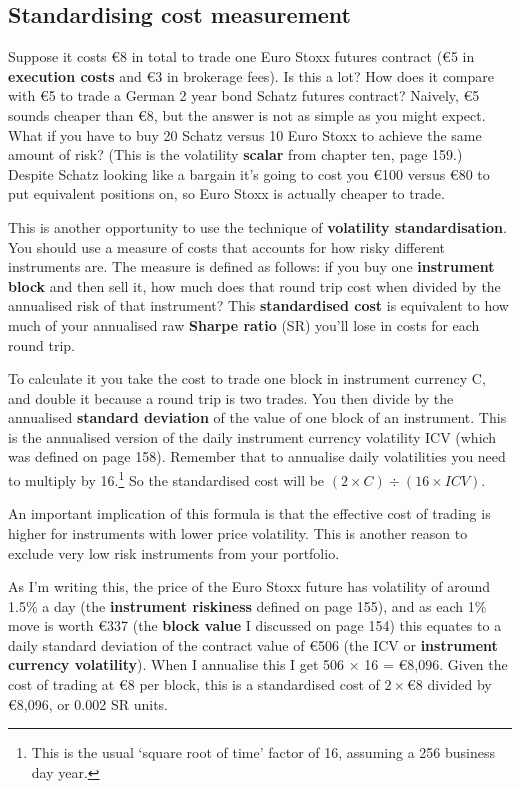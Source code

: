 \subsection*{Standardising cost measurement}

Suppose it costs €8 in total to trade one Euro Stoxx futures contract (€5 in \textbf{execution costs} and €3 in brokerage fees). Is this a lot? How does it compare with €5 to trade a German 2 year bond Schatz futures contract? Naively, €5 sounds cheaper than €8, but the answer is not as simple as you might expect. What if you have to buy 20 Schatz versus 10 Euro Stoxx to achieve the same amount of risk? (This is the volatility \textbf{scalar} from chapter ten, page 159.) Despite Schatz looking like a bargain it's going to cost you €100 versus €80 to put equivalent positions on, so Euro Stoxx is actually cheaper to trade.

This is another opportunity to use the technique of \textbf{volatility standardisation}. You should use a measure of costs that accounts for how risky different instruments are. The measure is defined as follows: if you buy one \textbf{instrument block} and then sell it, how much does that round trip cost when divided by the annualised risk of that instrument? This \textbf{standardised cost} is equivalent to how much of your annualised raw \textbf{Sharpe ratio} (SR) you'll lose in costs for each round trip.

To calculate it you take the cost to trade one block in instrument currency C, and double it because a round trip is two trades. You then divide by the annualised \textbf{standard deviation} of the value of one block of an instrument. This is the annualised version of the daily instrument currency volatility ICV (which was defined on page 158). Remember that to annualise daily volatilities you need to multiply by 16.\footnote{This is the usual ‘square root of time’ factor of 16, assuming a 256 business day year.} So the standardised cost will be \((2 \times C) \div (16 \times ICV)\).

An important implication of this formula is that the effective cost of trading is higher for instruments with lower price volatility. This is another reason to exclude very low risk instruments from your portfolio.

As I'm writing this, the price of the Euro Stoxx future has volatility of around 1.5\% a day (the \textbf{instrument riskiness} defined on page 155), and as each 1\% move is worth €337 (the \textbf{block value} I discussed on page 154) this equates to a daily standard deviation of the contract value of €506 (the ICV or \textbf{instrument currency volatility}). When I annualise this I get 506 × 16 = €8,096. Given the cost of trading at €8 per block, this is a standardised cost of \(2 \times €8\) divided by €8,096, or 0.002 SR units.

